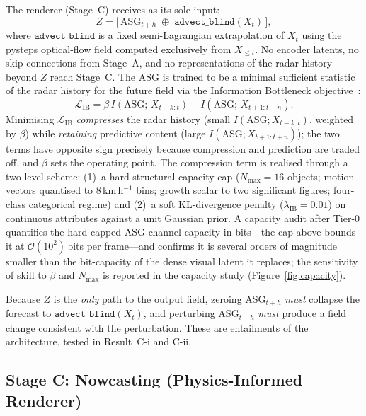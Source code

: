 \documentclass[fleqn,10pt]{wlscirep}
\begin{document}
The renderer (Stage~C) receives as its sole input:
\begin{equation}
    Z = \bigl[\, \text{ASG}_{t+h} \;\oplus\; \texttt{advect\_blind}(X_t) \,\bigr],
    \label{eq:bottleneck}
\end{equation}
where $\texttt{advect\_blind}$ is a fixed semi-Lagrangian extrapolation of $X_t$ using the pysteps optical-flow field computed exclusively from $X_{\le t}$.
No encoder latents, no skip connections from Stage~A, and no representations of the radar history beyond $Z$ reach Stage~C.
The ASG is trained to be a minimal sufficient statistic of the radar history for the future field via the Information Bottleneck objective~\cite{tishby1999ib,alemi2017vib}:
\begin{equation}
    \mathcal{L}_\text{IB} = \beta\, I(\text{ASG};\, X_{t-k:t}) - I(\text{ASG};\, X_{t+1:t+n}).
    \label{eq:ib}
\end{equation}
Minimising $\mathcal{L}_\text{IB}$ \emph{compresses} the radar history (small $I(\text{ASG};X_{t-k:t})$, weighted by $\beta$) while \emph{retaining} predictive content (large $I(\text{ASG};X_{t+1:t+n})$); the two terms have opposite sign precisely because compression and prediction are traded off, and $\beta$ sets the operating point.
The compression term is realised through a two-level scheme: (1)~a hard structural capacity cap ($N_\text{max}{=}16$ objects; motion vectors quantised to 8\,km\,h$^{-1}$ bins; growth scalar to two significant figures; four-class categorical regime) and (2)~a soft KL-divergence penalty ($\lambda_\text{IB}{=}0.01$) on continuous attributes against a unit Gaussian prior.
A capacity audit after Tier-0 quantifies the hard-capped ASG channel capacity in bits---the cap above bounds it at $\mathcal{O}(10^2)$\,bits per frame---and confirms it is several orders of magnitude smaller than the bit-capacity of the dense visual latent it replaces; the sensitivity of skill to $\beta$ and $N_\text{max}$ is reported in the capacity study (Figure~\ref{fig:capacity}).

Because $Z$ is the \emph{only} path to the output field, zeroing $\text{ASG}_{t+h}$ \emph{must} collapse the forecast to $\texttt{advect\_blind}(X_t)$, and perturbing $\text{ASG}_{t+h}$ \emph{must} produce a field change consistent with the perturbation.
These are entailments of the architecture, tested in Result~C-i and C-ii.

\subsection*{Stage C: Nowcasting (Physics-Informed Renderer)}
\end{document}
